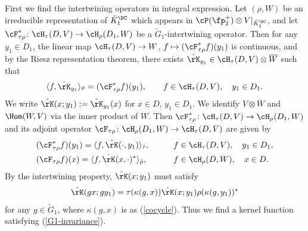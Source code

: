 First we find the intertwining operators in integral expression.
Let $(\rho,W)$ be an irreducible representation of $\tilde{K}_1^\BC$ which appears in $\cP(\fp^+_2)\otimes V|_{\tilde{K}_1^\BC}$,
and let $\cF_{\tau\rho}^*\colon \cH_\tau(D,V)\to \cH_{\rho}(D_1,W)$ be a $\tilde{G}_1$-intertwining operator.
Then for any $y_1\in D_1$, the linear map $\cH_\tau(D,V)\to W$, $f\mapsto (\cF_{\tau\rho}^* f)(y_1)$ is continuous,
and by the Riesz representation theorem, there exists $\hat{\rK}_{y_1}\in\cH_\tau(D,V)\otimes \overline{W}$ such that
\begin{gather*} \langle f,\hat{\rK}_{y_1}\rangle_{\hat{\tau}}=(\cF_{\tau\rho}^* f)(y_1), \qquad f\in\cH_\tau(D,V),\quad y_1\in D_1. \end{gather*}
We write $\hat{\rK}(x;y_1):=\hat{\rK}_{y_1}(x)$ for $x\in D$, $y_1\in D_1$.
We identify $V\otimes \overline{W}$ and $\Hom(W,V)$ via the inner product of $W$.
Then $\cF_{\tau\rho}^*\colon \cH_\tau(D,V)\to \cH_{\rho}(D_1,W)$ and its adjoint operator $\cF_{\tau\rho}\colon \cH_\rho(D_1,W)\to \cH_\tau(D,V)$ are given by
\begin{alignat*}{3}
&(\cF_{\tau\rho}^* f)(y_1)=\langle f,\hat{\rK}(\cdot,y_1)\rangle_{\hat{\tau}},\qquad && f\in\cH_\tau(D,V),\quad y_1\in D_1,\\
& (\cF_{\tau\rho} f)(x)=\langle f,\hat{\rK}(x,\cdot)^*\rangle_{\hat{\rho}}, \qquad && f\in\cH_\rho(D,W),\quad x\in D.
\end{alignat*}
By the intertwining property, $\hat{\rK}(x;y_1)$ must satisfy
\begin{gather}\label{G1-invariance}
\hat{\rK}(gx;gy_1)=\tau(\kappa(g,x))\hat{\rK}(x;y_1)\rho(\kappa(g,y_1))^*
\end{gather}
for any $g\in\tilde{G}_1$, where $\kappa(g,x)$ is as (\ref{cocycle}). Thus we find a kernel function satisfying (\ref{G1-invariance}).

